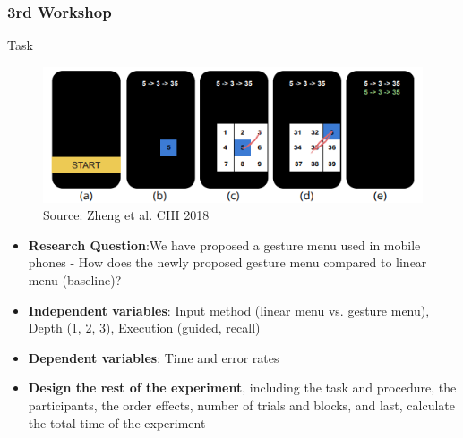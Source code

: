 \documentclass{beamer}
\begin{document}
\begin{frame}
	\frametitle{3rd Workshop}
	\begin{block}{Task}	
	\begin{figure}
		\includegraphics[width=0.5\linewidth]{gestures}
		\caption{Source: Zheng et al. CHI 2018}
	\end{figure}
	\vspace{-15pt}
	\footnotesize
	\begin{itemize}
		\item \textbf{Research Question}:We have proposed a gesture menu used in mobile phones - How does the newly proposed gesture menu compared to linear menu (baseline)?
		\item \textbf{Independent variables}: Input method (linear menu vs. gesture menu), Depth (1, 2, 3), Execution (guided, recall)
		\item \textbf{Dependent variables}: Time and error rates
		\item \textbf{Design the rest of the experiment}, including the task and procedure, the participants, the order effects, number of trials and blocks, and last, calculate the total time of the experiment
	\end{itemize}
	\end{block}
\end{frame}
%
\end{document}
